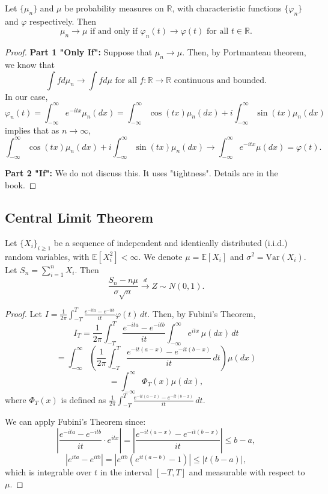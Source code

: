 \begin{theorem}
Let \(\{\mu_n\}\) and \(\mu\) be probability measures on \(\mathbb{R}\), with characteristic functions \(\{\varphi_n\}\) and \(\varphi\) respectively. Then 
\[
\mu_n \rightarrow \mu \text{ if and only if } \varphi_n(t) \rightarrow \varphi(t) \text{ for all } t \in \mathbb{R}.
\]
\end{theorem}

\begin{proof}
\textbf{Part 1 "Only If":} Suppose that \(\mu_n \rightarrow \mu\). Then, by Portmanteau theorem, we know that 
\[
\int f d\mu_n \rightarrow \int f d\mu \text{ for all } f: \mathbb{R} \rightarrow \mathbb{R} \text{ continuous and bounded}.
\]
In our case, 
\[
\varphi_n(t) = \int_{-\infty}^{\infty} e^{-itx} \mu_n(dx) = \int_{-\infty}^{\infty} \cos(tx) \mu_n(dx) + i \int_{-\infty}^{\infty} \sin(tx) \mu_n(dx)
\]
implies that as \(n \rightarrow \infty\), 
\[
\int_{-\infty}^{\infty} \cos(tx) \mu_n(dx) + i \int_{-\infty}^{\infty} \sin(tx) \mu_n(dx) \rightarrow \int_{-\infty}^{\infty} e^{-itx} \mu(dx) = \varphi(t).
\]

\textbf{Part 2 "If":} We do not discuss this. It uses "tightness". Details are in the book.
\end{proof}

\subsection{Central Limit Theorem}

\begin{theorem}
Let $\{X_i\}_{i\geq1}$ be a sequence of independent and identically distributed (i.i.d.) random variables, with $\mathbb{E}[X_i^2] < \infty$. We denote $\mu = \mathbb{E}[X_i]$ and $\sigma^2 = \mathrm{Var}(X_i)$. Let $S_n = \sum_{i=1}^{n} X_i$. Then
\[
\frac{S_n - n\mu}{\sigma\sqrt{n}} \xrightarrow{d} Z \sim N(0,1).
\]
\end{theorem}

\begin{proof}
    Let \( I = \frac{1}{2\pi} \int_{-T}^{T} \frac{e^{-ita} - e^{-itb}}{it} \varphi(t) \, dt \). Then, by Fubini's Theorem,
    \[
    I_T = \frac{1}{2\pi} \int_{-T}^{T} \frac{e^{-ita} - e^{-itb}}{it} \int_{-\infty}^{\infty} e^{itx} \, \mu(dx) \, dt
    \]
    \[
    = \int_{-\infty}^{\infty} \left( \frac{1}{2\pi} \int_{-T}^{T} \frac{e^{-it(a-x)} - e^{-it(b-x)}}{it} \, dt \right) \mu(dx)
    \]
    \[
    = \int_{-\infty}^{\infty} \Phi_T(x) \mu(dx),
    \]
    where \( \Phi_T(x) \) is defined as \( \frac{1}{2\pi} \int_{-T}^{T} \frac{e^{-it(a-x)} - e^{-it(b-x)}}{it} \, dt \).

    We can apply Fubini's Theorem since:
    \[
    \left| \frac{e^{-ita} - e^{-itb}}{it} \cdot e^{itx} \right| = \left| \frac{e^{-it(a-x)} - e^{-it(b-x)}}{it} \right| \leq b-a,
    \]
    \[
    \left| e^{ita} - e^{itb} \right| = \left| e^{itb}(e^{it(a-b)} - 1) \right| \leq |t(b-a)|,
    \]
    which is integrable over \( t \) in the interval \( [-T, T] \) and measurable with respect to \( \mu \).

\end{proof}

